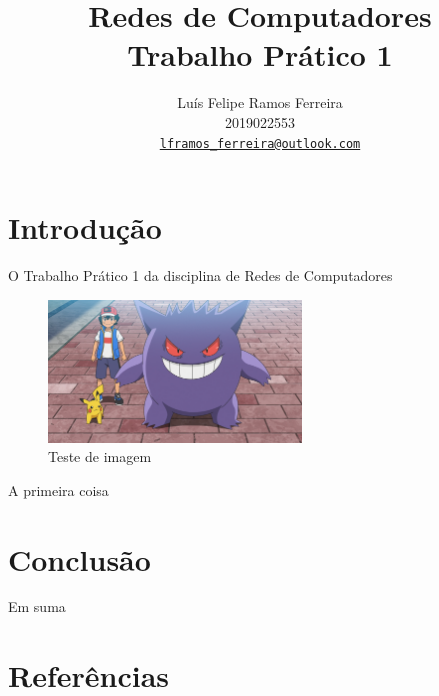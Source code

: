 \documentclass{article}
\title{Redes de Computadores \\ Trabalho Prático 1}
\author{Luís Felipe Ramos Ferreira \\ 2019022553 \\
      \href{mailto:lframos_ferreira@outlook.com}{\texttt{lframos\_ferreira@outlook.com}}}
\begin{document}
\maketitle

\section{Introdução}

O Trabalho Prático 1 da disciplina de Redes de Computadores

\begin{figure}[H]
      \centering
      \includegraphics[width=0.6\textwidth]{images/gengar.png}
      \caption{Teste de imagem}
\end{figure}

A primeira coisa

\section{Conclusão}

Em suma

\section{Referências}
\end{document}
